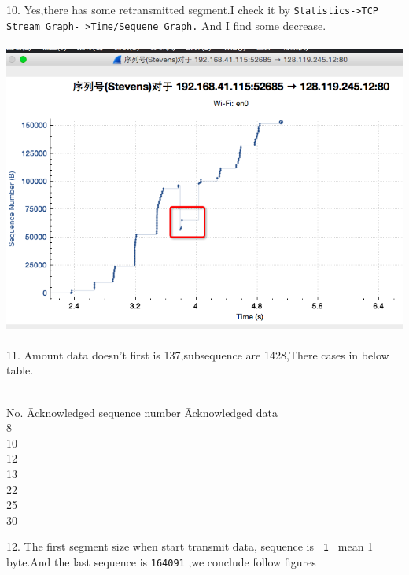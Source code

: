 \documentclass[a4paper]{article}
\begin{document}
{	10. Yes,there has some retransmitted segment.I check it by \verb|Statistics->TCP Stream Graph- >Time/Sequene Graph.| And I find some decrease.\\\\
	{\centering\includegraphics[scale=0.5]{Illustrations/10.png}}\\\\
	11. Amount data doesn't first is 137,subsequence are 1428,There cases in below table.\\\\ 
	\begin{tabbing}
	 \hspace{4em}	No.\hspace{4mm} \= Acknowledged sequence number\hspace{4mm} \= Acknowledged data \\
	 \hspace{4em}	8  \\
	 \hspace{4em}	10  \\
	 \hspace{4em}	12  \\
	 \hspace{4em}	13  \\
	 \hspace{4em}	22  \\
	 \hspace{4em}	25  \\
	 \hspace{4em}	30  \\
	\end{tabbing}
	12. The first segment size when start transmit data, sequence is \verb| 1 | mean 1 byte.And the last sequence is \verb |164091| ,we conclude follow figures\\
}
\end{document}

